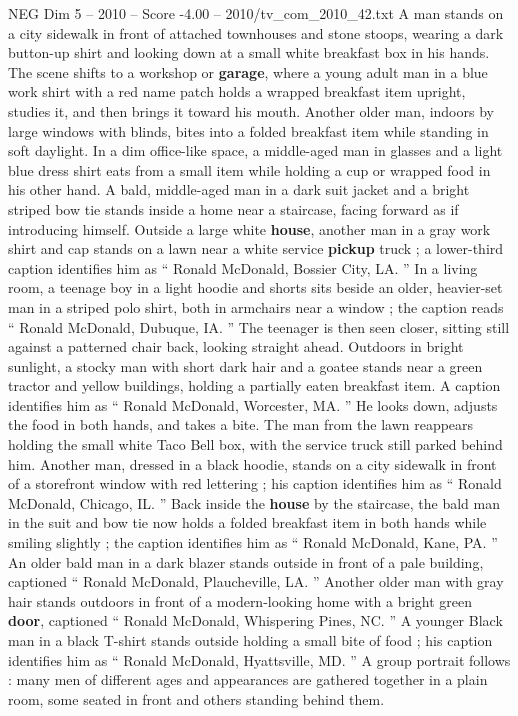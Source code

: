 \begin{textsample}{NEG Dim 5 – 2010 – Score -4.00 – 2010/tv\_com\_2010\_42.txt}  \label{ex:f5_neg_054}
A man stands on a city sidewalk in front of attached townhouses and stone stoops, wearing a dark button-up shirt and looking down at a small white breakfast box in his hands.
The scene shifts to a workshop or \textbf{garage}, where a young adult man in a blue work shirt with a red name patch holds a wrapped breakfast item upright, studies it, and then brings it toward his mouth.
Another older man, indoors by large windows with blinds, bites into a folded breakfast item while standing in soft daylight.
In a dim office-like space, a middle-aged man in glasses and a light blue dress shirt eats from a small item while holding a cup or wrapped food in his other hand.
A bald, middle-aged man in a dark suit jacket and a bright striped bow tie stands inside a home near a staircase, facing forward as if introducing himself.
Outside a large white \textbf{house}, another man in a gray work shirt and cap stands on a lawn near a white service \textbf{pickup} truck ; a lower-third caption identifies him as “ Ronald McDonald, Bossier City, LA. ” In a living room, a teenage boy in a light hoodie and shorts sits beside an older, heavier-set man in a striped polo shirt, both in armchairs near a window ; the caption reads “ Ronald McDonald, Dubuque, IA. ” The teenager is then seen closer, sitting still against a patterned chair back, looking straight ahead.
Outdoors in bright sunlight, a stocky man with short dark hair and a goatee stands near a green tractor and yellow buildings, holding a partially eaten breakfast item.
A caption identifies him as “ Ronald McDonald, Worcester, MA. ” He looks down, adjusts the food in both hands, and takes a bite.
The man from the lawn reappears holding the small white Taco Bell box, with the service truck still parked behind him.
Another man, dressed in a black hoodie, stands on a city sidewalk in front of a storefront window with red lettering ; his caption identifies him as “ Ronald McDonald, Chicago, IL. ” Back inside the \textbf{house} by the staircase, the bald man in the suit and bow tie now holds a folded breakfast item in both hands while smiling slightly ; the caption identifies him as “ Ronald McDonald, Kane, PA. ” An older bald man in a dark blazer stands outside in front of a pale building, captioned “ Ronald McDonald, Plaucheville, LA. ” Another older man with gray hair stands outdoors in front of a modern-looking home with a bright green \textbf{door}, captioned “ Ronald McDonald, Whispering Pines, NC. ” A younger Black man in a black T-shirt stands outside holding a small bite of food ; his caption identifies him as “ Ronald McDonald, Hyattsville, MD. ” A group portrait follows : many men of different ages and appearances are gathered together in a plain room, some seated in front and others standing behind them.

\end{textsample}

